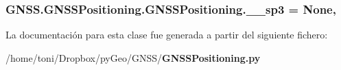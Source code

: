 \subsubsection[{\-\_\-\-\_\-sp3}]{\setlength{\rightskip}{0pt plus 5cm}G\-N\-S\-S.\-G\-N\-S\-S\-Positioning.\-G\-N\-S\-S\-Positioning.\-\_\-\-\_\-sp3 = None\hspace{0.3cm}{\ttfamily [static]}, {\ttfamily [private]}}\label{classGNSS_1_1GNSSPositioning_1_1GNSSPositioning_a27eee1bd65591dc84007596464904bc2}


La documentación para esta clase fue generada a partir del siguiente fichero\-:\begin{DoxyCompactItemize}
\item 
/home/toni/\-Dropbox/py\-Geo/\-G\-N\-S\-S/{\bf G\-N\-S\-S\-Positioning.\-py}\end{DoxyCompactItemize}
